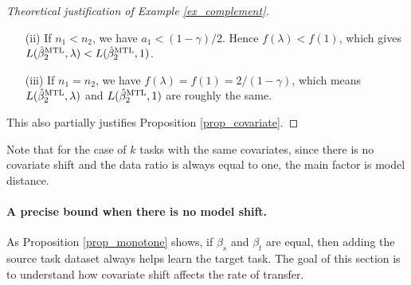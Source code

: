 \begin{proof}[Theoretical justification of Example \ref{ex_complement}]
\begin{itemize}
\item[(ii)] If $n_1< n_2$, we have $a_1< (1-\gamma)/2$. Hence $f(\lambda)< f(1)$, which gives $L(\hat \beta_{2}^{\text{MTL}},\lambda)<L(\hat \beta_{2}^{\text{MTL}},1)$. 

\item[(iii)] If $n_1=n_2$, we have $f(\lambda)=f(1)=2/(1-\gamma)$, which means $L(\hat \beta_{2}^{\text{MTL}},\lambda)$ and $L(\hat \beta_{2}^{\text{MTL}},1)$ are roughly the same. %
\end{itemize}
This also partially justifies Proposition \ref{prop_covariate}. %
\end{proof}
\fi

\iffalse
Note that for the case of $k$ tasks with the same covariates, since there is no covariate shift and the data ratio is always equal to one, the main factor is model distance.

\paragraph{A precise bound when there is no model shift.}
As Proposition \ref{prop_monotone} shows, if $\beta_s$ and $\beta_t$ are equal, then adding the source task dataset always helps learn the target task.
The goal of this section is to understand how covariate shift affects the rate of transfer. 


